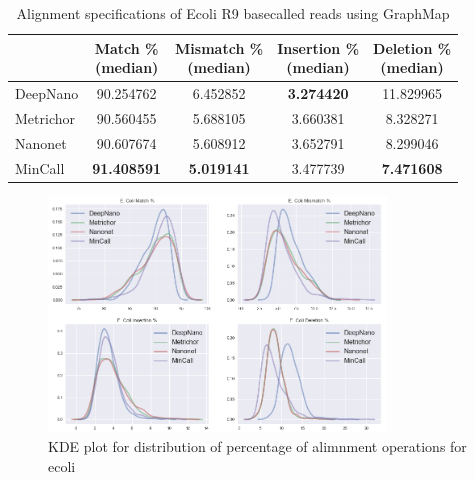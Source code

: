 \documentclass[runningheads,a4paper]{llncs}
\begin{document}
\begin{table}[]
	\caption{Alignment specifications of Ecoli R9 basecalled reads using GraphMap}
	\label{tbl:ecoli_rates}
	\centering
	\begin{tabular}{lcccc}
		\toprule
		{} &  \thead{Match \% \\(median)} &  \thead{Mismatch \% \\(median)} &  \thead{Insertion \% \\(median)} &  \thead{Deletion \% \\(median)} \\
		\midrule
		DeepNano   &                  90.254762 &                      6.452852 &                       \textbf{3.274420} &                     11.829965 \\
		Metrichor  &                  90.560455 &                      5.688105 &                       3.660381 &                      8.328271 \\
		Nanonet    &                  90.607674 &                      5.608912 &                       3.652791 &                      8.299046 \\
		MinCall    &                  \textbf{91.408591} &                     \textbf{ 5.019141} &                       3.477739 &                      \textbf{7.471608 }\\
		\bottomrule
	\end{tabular}
\end{table}

\begin{figure}[]
	\begin{center}
		\includegraphics[width=0.8\textwidth]{./imgs/results/ecoli/kde_cigar.png}
		\caption{KDE plot for distribution of percentage of alimnment operations for ecoli}
		\label{fg:ecoli_kde}
	\end{center}
\end{figure}
\end{document}
